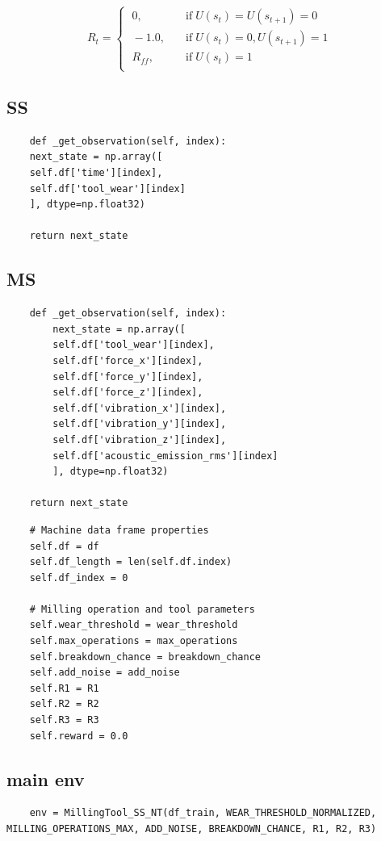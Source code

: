 \documentclass[a4paper, 12pt]{article}
\begin{document}
\begin{equation}
R_t =
\begin{cases}
		\; 0, &  \quad \text{if}\; U(s_t) = U(s_{t+1}) = 0 \\
	\; -1.0, & \quad \text{if}\; U(s_t) = 0, U(s_{t+1}) = 1 \\
	\; R_{ff}, & \quad \text{if}\; U(s_t) = 1\\
\end{cases}
\label{eq:RewardFunction}
\end{equation}

\subsection{SS}
\begin{verbatim}
	def _get_observation(self, index):
	next_state = np.array([
	self.df['time'][index],
	self.df['tool_wear'][index]
	], dtype=np.float32)
	
	return next_state
\end{verbatim}

\subsection{MS}
\begin{verbatim}
	def _get_observation(self, index):
		next_state = np.array([
		self.df['tool_wear'][index],
		self.df['force_x'][index],
		self.df['force_y'][index],
		self.df['force_z'][index],
		self.df['vibration_x'][index],
		self.df['vibration_y'][index],
		self.df['vibration_z'][index],
		self.df['acoustic_emission_rms'][index]
		], dtype=np.float32)
	
	return next_state
\end{verbatim}

\begin{verbatim}
	# Machine data frame properties
	self.df = df
	self.df_length = len(self.df.index)
	self.df_index = 0
	
	# Milling operation and tool parameters
	self.wear_threshold = wear_threshold
	self.max_operations = max_operations
	self.breakdown_chance = breakdown_chance
	self.add_noise = add_noise
	self.R1 = R1
	self.R2 = R2
	self.R3 = R3
	self.reward = 0.0
\end{verbatim}

\subsection{main env}
\begin{verbatim}
	env = MillingTool_SS_NT(df_train, WEAR_THRESHOLD_NORMALIZED, MILLING_OPERATIONS_MAX, ADD_NOISE, BREAKDOWN_CHANCE, R1, R2, R3)
\end{verbatim}
\end{document}
